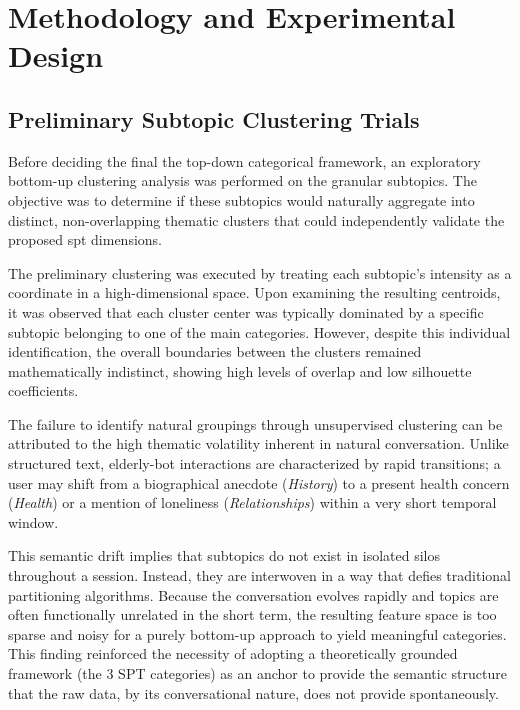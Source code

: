 \section{Methodology and Experimental Design}

\subsection{Preliminary Subtopic Clustering Trials}

Before deciding the final the top-down categorical framework, an exploratory bottom-up clustering analysis was performed on the granular subtopics. The objective was to determine if these subtopics would naturally aggregate into distinct, non-overlapping thematic clusters that could independently validate the proposed \gls{spt} dimensions.


The preliminary clustering was executed by treating each subtopic's intensity as a coordinate in a high-dimensional space. Upon examining the resulting centroids, it was observed that each cluster center was typically dominated by a specific subtopic belonging to one of the main categories. However, despite this individual identification, the overall boundaries between the clusters remained mathematically indistinct, showing high levels of overlap and low silhouette coefficients.

The failure to identify natural groupings through unsupervised clustering can be attributed to the high thematic volatility inherent in natural conversation. Unlike structured text, elderly-bot interactions are characterized by rapid transitions; a user may shift from a biographical anecdote (\textit{History}) to a present health concern (\textit{Health}) or a mention of loneliness (\textit{Relationships}) within a very short temporal window. 

This semantic drift implies that subtopics do not exist in isolated silos throughout a session. Instead, they are interwoven in a way that defies traditional partitioning algorithms. Because the conversation evolves rapidly and topics are often functionally unrelated in the short term, the resulting feature space is too sparse and noisy for a purely bottom-up approach to yield meaningful categories. This finding reinforced the necessity of adopting a theoretically grounded framework (the 3 SPT categories) as an anchor to provide the semantic structure that the raw data, by its conversational nature, does not provide spontaneously.





